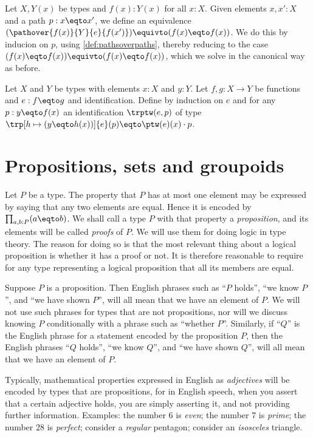 \begin{definition}\label{def:Dan's-lemma}
Let $X,Y(x)$ be types and $f(x): Y(x)$ for all $x:X$.
Given elements $x,x':X$ and a path $p : x \eqto x'$, we define an equivalence
$(\pathover{f(x)}{Y}{e}{f(x')}) \equivto (f(x) \eqto f(x))$.
We do this by inducion on $p$, using \cref{def:pathsoverpaths},
thereby reducing to the case $(f(x) \eqto f(x)) \equivto (f(x) \eqto f(x))$,
which we solve in the canonical way as before.
\end{definition}

\begin{xca}\label{xca:trp-in-y=_(x)}
Let $X$ and $Y$ be types with elements $x:X$ and $y:Y$. 
Let $f,g: X\to Y$ be functions and $e: f\eqto g$ and identification.
Define by induction on $e$ and for any $p:y\eqto f(x)$ an identification 
$\trptw(e,p)$ of type 
$\trp[h\mapsto (y\eqto h(x))]{e}(p) \eqto \ptw(e)(x)\cdot p$. 
\end{xca}


\section{Propositions, sets and groupoids}
\label{sec:props-sets-grpds}

Let $P$ be a type.  The property that $P$ has at most one element may
be expressed by saying that any two elements are equal.
Hence it is encoded by $\prod_{a,b:P} (a \eqto b)$.
We shall call a type $P$ with that property a \emph{proposition},%
and its elements will be called \emph{proofs} of $P$.%
We will use them for doing logic in type theory.
The reason for doing so is that the most relevant
thing about a logical proposition is whether it has a proof or not.
It is therefore reasonable to require for any type representing
a logical proposition that all its members are equal.

Suppose $P$ is a proposition.  Then English phrases such as ``$P$ holds'', ``we know $P$'', and ``we have shown $P$'', will all mean that we
have an element of $P$.  We will not use such phrases for types that are not propositions, nor will we discuss knowing $P$ conditionally with a
phrase such as ``whether $P$''.  Similarly, if ``$Q$'' is the English phrase for a statement encoded by the proposition $P$, then the English
phrases ``$Q$ holds'', ``we know $Q$'', and ``we have shown $Q$'', will all mean that we have an element of $P$.

Typically, mathematical properties expressed in English as \emph{adjectives} will be encoded by types that are propositions, for in English
speech, when you assert that a certain adjective holds, you are simply asserting it, and not providing further information.  Examples: the
number $6$ is \emph{even}; the number $7$ is \emph{prime}; the number $28$ is \emph{perfect}; consider a \emph{regular} pentagon; consider an
\emph{isosceles} triangle.

